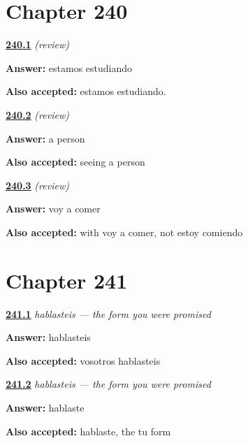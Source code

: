 \section*{Chapter 240}

\noindent\begin{minipage}[t]{\linewidth}
\raggedright
\hyperlink{review-ES-C62-repaso-gerundio-now}{\textbf{240.1}} \emph{(review)}\par
\small \textbf{Answer:} estamos estudiando\par
\footnotesize \textbf{Also accepted:} estamos estudiando.
\end{minipage}\par\medskip

\noindent\begin{minipage}[t]{\linewidth}
\raggedright
\hyperlink{review-ES-C62-repaso-gerundio-a}{\textbf{240.2}} \emph{(review)}\par
\small \textbf{Answer:} a person\par
\footnotesize \textbf{Also accepted:} seeing a person
\end{minipage}\par\medskip

\noindent\begin{minipage}[t]{\linewidth}
\raggedright
\hyperlink{review-ES-C62-repaso-gerundio-tomorrow}{\textbf{240.3}} \emph{(review)}\par
\small \textbf{Answer:} voy a comer\par
\footnotesize \textbf{Also accepted:} with voy a comer, not estoy comiendo
\end{minipage}\par\medskip

\section*{Chapter 241}

\noindent\begin{minipage}[t]{\linewidth}
\raggedright
\hyperlink{review-ES-C63-hablasteis-make}{\textbf{241.1}} \emph{hablasteis — the form you were promised}\par
\small \textbf{Answer:} hablasteis\par
\footnotesize \textbf{Also accepted:} vosotros hablasteis
\end{minipage}\par\medskip

\noindent\begin{minipage}[t]{\linewidth}
\raggedright
\hyperlink{review-ES-C63-hablasteis-parts}{\textbf{241.2}} \emph{hablasteis — the form you were promised}\par
\small \textbf{Answer:} hablaste\par
\footnotesize \textbf{Also accepted:} hablaste, the tu form
\end{minipage}\par\medskip

